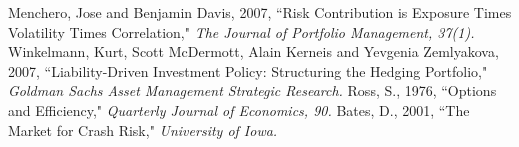 \documentclass[12pt,letterpaper]{article}
\theoremstyle{definition}
\begin{document}
\newpage
\begin{thebibliography}{4}  
\bibitem{} Menchero, Jose and Benjamin Davis, 2007, ``Risk Contribution is Exposure Times Volatility Times Correlation," \emph{The Journal of Portfolio Management, 37(1).} 
\bibitem{}  Winkelmann, Kurt, Scott McDermott, Alain Kerneis and Yevgenia Zemlyakova, 2007, ``Liability-Driven Investment Policy: Structuring the Hedging Portfolio," \emph{Goldman Sachs Asset Management Strategic Research.}
\bibitem{}  Ross, S., 1976, ``Options and Efficiency," \emph{Quarterly Journal of Economics, 90.}
\bibitem{}  Bates, D., 2001, ``The Market for Crash Risk," \emph{University of Iowa.}
\end{thebibliography}
\end{document}
